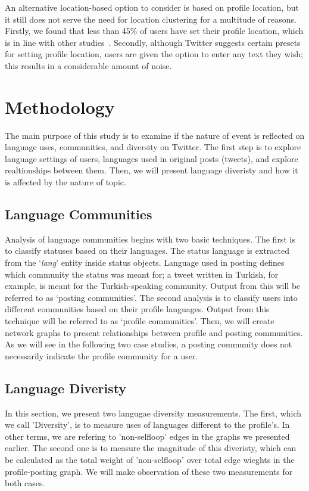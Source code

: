 An alternative location-based option to consider is based on profile
location, but it still does not serve the need for location clustering
for a multitude of reasons. Firstly, we found that less than 45\% of
users have set their profile location, which is in line with other
studies~\cite{graham-et-al:2014}. Secondly, although Twitter suggests
certain presets for setting profile location, users are given the
option to enter any text they wish; this results in a considerable
amount of noise.

\section{Methodology}\label{method}

The main purpose of this study is to examine if the nature of event is
reflected on language uses, communities, and diversity on Twitter.
The first step is to explore language settings of users, languages used in 
original posts (tweets), and explore realtionships between them. Then, we 
will present language diveristy and how it is affected by the nature of topic. 

\subsection{Language Communities}\label{langcomm}

Analysis of language communities begins with two basic techniques. The
first is to classify statuses based on their languages. The status
language is extracted from the `{\emph{lang}}' entity inside status
objects. Language used in posting defines which community the status
was meant for; a tweet written in Turkish, for example, is meant for
the Turkish-speaking community. Output from this will be referred to
as `posting communities'. The second analysis is to classify users
into different communities based on their profile languages. Output from this
technique will be referred to as `profile communities'. Then, we will create 
network graphs to present relationships between profile and posting communities.  
As we will see in the following two case studies, a posting community does not
necessarily indicate the profile community for a user. 

\subsection{Language Diveristy}\label{diversity}

In this section, we present two langugae diversity measurements. The first, 
which we call 'Diversity', is to measure uses of languages different to the 
profile's. In other terms, we are refering to 'non-selfloop' edges in the graphs we 
presented earlier. The second one is to measure the magnitude of this diveristy, which
can be calculated as the total weight of 'non-selfloop' over total edge wieghts in the 
profile-posting graph. We will make observation of these two measurements for 
both cases.

